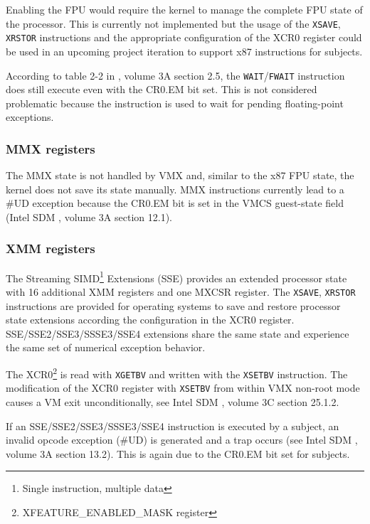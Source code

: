 Enabling the FPU would require the kernel to manage the complete FPU state of
the processor. This is currently not implemented but the usage of the
\texttt{XSAVE}, \texttt{XRSTOR} instructions and the appropriate configuration
of the XCR0 register could be used in an upcoming project iteration to support
x87 instructions for subjects.

According to table 2-2 in \cite{IntelSDM}, volume 3A section 2.5, the
\texttt{WAIT}/\texttt{FWAIT} instruction does still execute even with the CR0.EM
bit set. This is not considered problematic because the instruction is used to
wait for pending floating-point exceptions.

\subsubsection{MMX registers}
The MMX state is not handled by VMX and, similar to the x87 FPU state, the
kernel does not save its state manually. MMX instructions currently lead to a
\#UD exception because the CR0.EM bit is set in the VMCS guest-state field
(Intel SDM \cite{IntelSDM}, volume 3A section 12.1).

\subsubsection{XMM registers}
The Streaming SIMD\footnote{Single instruction, multiple data}
Extensions (SSE) provides an extended processor state with
16 additional XMM registers and one MXCSR register. The \texttt{XSAVE},
\texttt{XRSTOR} instructions are provided for operating systems to save and
restore processor state extensions according the configuration in the XCR0
register. SSE/SSE2/SSE3/SSSE3/SSE4 extensions share the same state and
experience the same set of numerical exception behavior.

The XCR0\footnote{XFEATURE\_ENABLED\_MASK register} is read with
\texttt{XGETBV} and written with the \texttt{XSETBV} instruction. The
modification of the XCR0 register with \texttt{XSETBV} from within VMX non-root
mode causes a VM exit unconditionally, see Intel SDM \cite{IntelSDM}, volume 3C
section 25.1.2.

If an SSE/SSE2/SSE3/SSSE3/SSE4 instruction is executed by a subject, an invalid
opcode exception (\#UD) is generated and a trap occurs (see Intel SDM
\cite{IntelSDM}, volume 3A section 13.2). This is again due to the CR0.EM bit
set for subjects.

